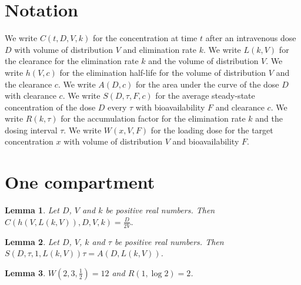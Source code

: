 \documentclass{article}
\newtheorem{lemma}{Lemma}
\begin{document}
\section{Notation}

We write $C(t,D,V,k)$ for the concentration at time $t$ after an intravenous dose $D$ with volume of distribution $V$ and elimination rate $k$.
We write $L(k,V)$ for the clearance for the elimination rate $k$ and the volume of distribution $V$.
We write $h(V,c)$ for the elimination half-life for the volume of distribution $V$ and the clearance $c$.
We write $A(D,c)$ for the area under the curve of the dose $D$ with clearance $c$.
We write $S(D,\tau,F,c)$ for the average steady-state concentration of the dose $D$ every $\tau$ with bioavailability $F$ and clearance $c$.
We write $R(k,\tau)$ for the accumulation factor for the elimination rate $k$ and the dosing interval $\tau$.
We write $W(x,V,F)$ for the loading dose for the target concentration $x$ with volume of distribution $V$ and bioavailability $F$.

\section{One compartment}

\begin{lemma}\label{halflife}
Let $D$, $V$ and $k$ be positive real numbers. Then $C(h(V,L(k,V)),D,V,k)=\frac{D}{2V}$.
\end{lemma}

\begin{lemma}\label{steady}
Let $D$, $V$, $k$ and $\tau$ be positive real numbers. Then $S(D,\tau,1,L(k,V))\tau=A(D,L(k,V))$.
\end{lemma}

\begin{lemma}\label{doses}
$W(2,3,\frac12)=12$ and $R(1,\log2)=2$.
\end{lemma}
\end{document}
